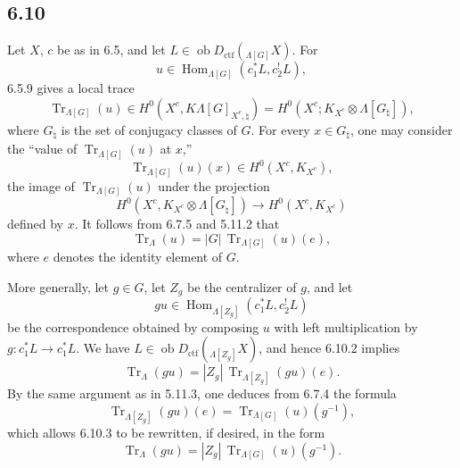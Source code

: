 \documentclass[11pt]{article}
\DeclareMathOperator{\Hom}{Hom}
\providecommand{\Tr}{\operatorname{Tr}}
\providecommand{\Tr}{\operatorname{Tr}}
\providecommand{\Ob}{\operatorname{ob}}
\providecommand{\Tr}{\operatorname{Tr}}
\providecommand{\Hom}{\operatorname{Hom}}
\providecommand{\Ob}{\operatorname{ob}}
\providecommand{\Tr}{\operatorname{Tr}}
\providecommand{\Ob}{\operatorname{Ob}}
\providecommand{\Hom}{\operatorname{Hom}}
\providecommand{\Tr}{\operatorname{Tr}}
\providecommand{\Ob}{\operatorname{ob}}
\providecommand{\Ob}{\operatorname{Ob}}
\begin{document}
\subsection*{6.10}
Let $X$, $c$ be as in 6.5, and let $L\in\Ob D_{\mathrm{ctf}}({}_{\Lambda[G]}X)$. For
\[
u\in\Hom_{\Lambda[G]}(c_1^*L,c_2^!L),
\]
6.5.9 gives a local trace
\begin{equation}
\Tr_{\Lambda[G]}(u)\in
H^0(X^c,K\Lambda[G]_{X^c,\natural})
=H^0(X^c;K_{X^c}\otimes\Lambda[G_{\natural}]),
\tag{6.10.1}
\end{equation}
where $G_{\natural}$ is the set of conjugacy classes of $G$. For every $x\in G_{\natural}$, one may consider the “value of $\Tr_{\Lambda[G]}(u)$ at $x$,”
\[
\Tr_{\Lambda[G]}(u)(x)\in H^0(X^c,K_{X^c}),
\]
the image of $\Tr_{\Lambda[G]}(u)$ under the projection
\[
H^0(X^c,K_{X^c}\otimes\Lambda[G_{\natural}])
\longrightarrow H^0(X^c,K_{X^c})
\]
defined by $x$. It follows from 6.7.5 and 5.11.2 that
\begin{equation}
\Tr_{\Lambda}(u)=|G|\,\Tr_{\Lambda[G]}(u)(e),
\tag{6.10.2}
\end{equation}
where $e$ denotes the identity element of $G$.

More generally, let $g\in G$, let $Z_g$ be the centralizer of $g$, and let
\[
gu\in\Hom_{\Lambda[Z_g]}(c_1^*L,c_2^!L)
\]
be the correspondence obtained by composing $u$ with left multiplication by $g:c_1^*L\to c_1^*L$. We have $L\in\Ob D_{\mathrm{ctf}}({}_{\Lambda[Z_g]}X)$, and hence 6.10.2 implies
\begin{equation}
\Tr_{\Lambda}(gu)=|Z_g|\,\Tr_{\Lambda[Z_g]}(gu)(e).
\tag{6.10.3}
\end{equation}
By the same argument as in 5.11.3, one deduces from 6.7.4 the formula
\begin{equation}
\Tr_{\Lambda[Z_g]}(gu)(e)=\Tr_{\Lambda[G]}(u)(g^{-1}),
\tag{6.10.4}
\end{equation}
which allows 6.10.3 to be rewritten, if desired, in the form
\begin{equation}
\Tr_{\Lambda}(gu)=|Z_g|\,\Tr_{\Lambda[G]}(u)(g^{-1}).
\tag{6.10.5}
\end{equation}
\end{document}
